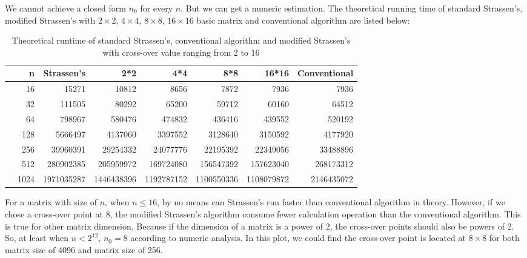 \documentclass[a4paper, 11pt]{article}
\begin{document}
We cannot achieve a closed form $n_0$ for every $n$. But we can get a numeric estimation. The theoretical running time of standard Strassen's, modified Strassen's with $2\times2$, $4\times4$, $8 \times 8$, $16 \times 16$ basic matrix and conventional algorithm are listed below:
\begin{table}[ht]
	\centering
	\caption{Theoretical runtime of standard Strassen's, conventional algorithm and modified Strassen's with cross-over value ranging from 2 to 16}
	\begin{tabular}{rrrrrrrr}
		\hline
		& n & Strassen's & 2*2 & 4*4 & 8*8 & 16*16 & Conventional \\ 
		\hline
		 & 16 & 15271 & 10812 & 8656 &\cellcolor{blue!25} 7872 & 7936 & 7936 \\ 
	 & 32 & 111505 & 80292 & 65200 &\cellcolor{blue!25}  59712 & 60160 & 64512 \\ 
		& 64 & 798967 & 580476 & 474832 &\cellcolor{blue!25}  436416 & 439552 & 520192 \\ 
		 & 128 & 5666497 & 4137060 & 3397552 &\cellcolor{blue!25}  3128640 & 3150592 & 4177920 \\ 
		 & 256 & 39960391 & 29254332 & 24077776 &\cellcolor{blue!25}  22195392 & 22349056 & 33488896 \\ 
		 & 512 & 280902385 & 205959972 & 169724080 &\cellcolor{blue!25}  156547392 & 157623040 & 268173312 \\ 
		 & 1024 & 1971035287 & 1446438396 & 1192787152 &\cellcolor{blue!25}  1100550336 & 1108079872 & 2146435072 \\ 
		\hline
	\end{tabular}
\end{table}
For a matrix with size of $n$, when $n\leq 16$, by no means can Strassen's run faster than conventional algorithm in theory. However, if we chose a cross-over point at 8, the modified Strassen's algorithm consume fewer calculation operation than the conventional algorithm. This is true for other matrix dimension. Because if the dimension of a matrix is a power of 2, the cross-over points should also be powers of 2. So, at least when $n<2^{12}$, $n_0=8$ according to numeric analysis.
In this plot, we could find the cross-over point is located at $8\times8$ for both matrix size of 4096 and matrix size of 256.
\end{document}
